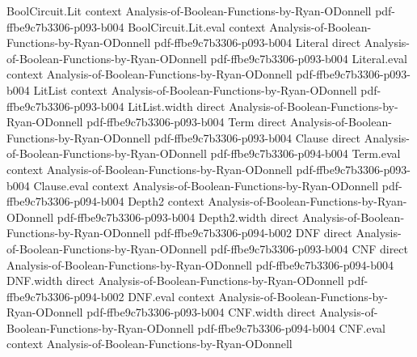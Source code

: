 \begin{lemma}
\label{DecisionTree.coeffs_mul_two_pow_int}
\leanok
{}
\proofstep
  {BoolCircuit.Lit}
  {context}
  {Analysis-of-Boolean-Functions-by-Ryan-ODonnell}
  {pdf-ffbe9c7b3306-p093-b004}
\proofstep
  {BoolCircuit.Lit.eval}
  {context}
  {Analysis-of-Boolean-Functions-by-Ryan-ODonnell}
  {pdf-ffbe9c7b3306-p093-b004}
\proofstep
  {Literal}
  {direct}
  {Analysis-of-Boolean-Functions-by-Ryan-ODonnell}
  {pdf-ffbe9c7b3306-p093-b004}
\proofstep
  {Literal.eval}
  {context}
  {Analysis-of-Boolean-Functions-by-Ryan-ODonnell}
  {pdf-ffbe9c7b3306-p093-b004}
\proofstep
  {LitList}
  {context}
  {Analysis-of-Boolean-Functions-by-Ryan-ODonnell}
  {pdf-ffbe9c7b3306-p093-b004}
\proofstep
  {LitList.width}
  {direct}
  {Analysis-of-Boolean-Functions-by-Ryan-ODonnell}
  {pdf-ffbe9c7b3306-p093-b004}
\proofstep
  {Term}
  {direct}
  {Analysis-of-Boolean-Functions-by-Ryan-ODonnell}
  {pdf-ffbe9c7b3306-p093-b004}
\proofstep
  {Clause}
  {direct}
  {Analysis-of-Boolean-Functions-by-Ryan-ODonnell}
  {pdf-ffbe9c7b3306-p094-b004}
\proofstep
  {Term.eval}
  {context}
  {Analysis-of-Boolean-Functions-by-Ryan-ODonnell}
  {pdf-ffbe9c7b3306-p093-b004}
\proofstep
  {Clause.eval}
  {context}
  {Analysis-of-Boolean-Functions-by-Ryan-ODonnell}
  {pdf-ffbe9c7b3306-p094-b004}
\proofstep
  {Depth2}
  {context}
  {Analysis-of-Boolean-Functions-by-Ryan-ODonnell}
  {pdf-ffbe9c7b3306-p093-b004}
\proofstep
  {Depth2.width}
  {direct}
  {Analysis-of-Boolean-Functions-by-Ryan-ODonnell}
  {pdf-ffbe9c7b3306-p094-b002}
\proofstep
  {DNF}
  {direct}
  {Analysis-of-Boolean-Functions-by-Ryan-ODonnell}
  {pdf-ffbe9c7b3306-p093-b004}
\proofstep
  {CNF}
  {direct}
  {Analysis-of-Boolean-Functions-by-Ryan-ODonnell}
  {pdf-ffbe9c7b3306-p094-b004}
\proofstep
  {DNF.width}
  {direct}
  {Analysis-of-Boolean-Functions-by-Ryan-ODonnell}
  {pdf-ffbe9c7b3306-p094-b002}
\proofstep
  {DNF.eval}
  {context}
  {Analysis-of-Boolean-Functions-by-Ryan-ODonnell}
  {pdf-ffbe9c7b3306-p093-b004}
\proofstep
  {CNF.width}
  {direct}
  {Analysis-of-Boolean-Functions-by-Ryan-ODonnell}
  {pdf-ffbe9c7b3306-p094-b004}
\proofstep
  {CNF.eval}
  {context}
  {Analysis-of-Boolean-Functions-by-Ryan-ODonnell}

\end{lemma}

